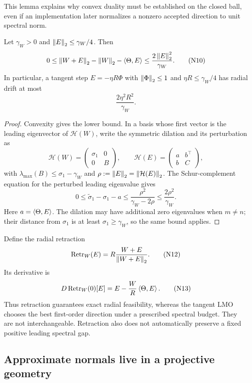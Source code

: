 This lemma explains why convex duality must be established on the closed ball,
even if an implementation later normalizes a nonzero accepted direction to
unit spectral norm.

\begin{lemma}
\label{lem:normal-remainder}
Let \(\gamma_W>0\) and \(\left\lVert E\right\rVert_{2}\le\gamma_W/4\).  Then
\[
 0
 \le
 \left\lVert W+E\right\rVert_{2}-\left\lVert W\right\rVert_{2}-\left\langle \Theta,E\right\rangle
 \le
 \frac{2\left\lVert E\right\rVert_{2}^2}{\gamma_W}.
\tag{N10}
\label{eq:normal-remainder}
\]
In particular, a tangent step \(E=-\eta R\Phi\) with
\(\left\lVert \Phi\right\rVert_{2}\le1\) and \(\eta R\le\gamma_W/4\) has radial drift at most
\[
 \frac{2\eta^2R^2}{\gamma_W}.
\tag{N11}
\label{eq:linearization-drift}
\]
\end{lemma}

\begin{proof}
Convexity gives the lower bound.  In a basis whose first vector is the leading
eigenvector of \(\mathcal H(W)\), write the symmetric dilation and its
perturbation as
\[
 \mathcal H(W)=\begin{pmatrix}\sigma_1&0\\0&B\end{pmatrix},
 \qquad
 \mathcal H(E)=\begin{pmatrix}a&b^\top\\b&C\end{pmatrix},
\]
with \(\lambda_{\max}(B)\le\sigma_1-\gamma_W\) and
\(\rho:=\left\lVert E\right\rVert_{2}=\left\lVert \mathcal H(E)\right\rVert_{2}\).  The Schur-complement equation for
the perturbed leading eigenvalue gives
\[
 0\le\widetilde\sigma_1-\sigma_1-a
 \le \frac{\rho^2}{\gamma_W-2\rho}
 \le \frac{2\rho^2}{\gamma_W}.
\]
Here \(a=\left\langle \Theta,E\right\rangle\).  The dilation may have additional zero eigenvalues
when \(m\ne n\); their distance from \(\sigma_1\) is at least
\(\sigma_1\ge\gamma_W\), so the same bound applies.
\end{proof}

Define the radial retraction
\[
 \operatorname{Retr}_W(E)=R\frac{W+E}{\left\lVert W+E\right\rVert_{2}}.
\tag{N12}
\label{eq:radial-retraction}
\]
Its derivative is
\[
 D\operatorname{Retr}_W(0)[E]
 =
 E-\frac WR\left\langle \Theta,E\right\rangle.
\tag{N13}
\label{eq:retraction-derivative}
\]
Thus retraction guarantees exact radial feasibility, whereas the tangent LMO
chooses the best first-order direction under a prescribed spectral budget.
They are not interchangeable.  Retraction also does not automatically
preserve a fixed positive leading spectral gap.

\subsection{Approximate normals live in a projective geometry}

